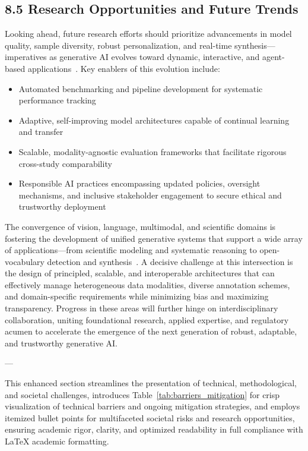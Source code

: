 \documentclass[11pt]{article}
\begin{document}
\subsection{8.5 Research Opportunities and Future Trends}

Looking ahead, future research efforts should prioritize advancements in model quality, sample diversity, robust personalization, and real-time synthesis—imperatives as generative AI evolves toward dynamic, interactive, and agent-based applications~\cite{88,89,90,101,102}. Key enablers of this evolution include:

\begin{itemize}
    \item Automated benchmarking and pipeline development for systematic performance tracking~\cite{88,89}
    \item Adaptive, self-improving model architectures capable of continual learning and transfer
    \item Scalable, modality-agnostic evaluation frameworks that facilitate rigorous cross-study comparability
    \item Responsible AI practices encompassing updated policies, oversight mechanisms, and inclusive stakeholder engagement to secure ethical and trustworthy deployment~\cite{1,8,11,15,16,24,32,54,58,60,63,67,68,69,70,76,77,78,81,82,88,89}
\end{itemize}

The convergence of vision, language, multimodal, and scientific domains is fostering the development of unified generative systems that support a wide array of applications—from scientific modeling and systematic reasoning to open-vocabulary detection and synthesis~\cite{1,2,3,5,6,7,8,9,10,12,13,14,15,16,18,21,22,24,25,26,27,28,29,30,31,32,33,34,35,39,40,42,43,44,45,51,52,53,54,55,56,57,58,59,60,63,67,69,70,76,77,78,79,80,81,82}. A decisive challenge at this intersection is the design of principled, scalable, and interoperable architectures that can effectively manage heterogeneous data modalities, diverse annotation schemes, and domain-specific requirements while minimizing bias and maximizing transparency. Progress in these areas will further hinge on interdisciplinary collaboration, uniting foundational research, applied expertise, and regulatory acumen to accelerate the emergence of the next generation of robust, adaptable, and trustworthy generative AI.

---

This enhanced section streamlines the presentation of technical, methodological, and societal challenges, introduces Table~\ref{tab:barriers_mitigation} for crisp visualization of technical barriers and ongoing mitigation strategies, and employs itemized bullet points for multifaceted societal risks and research opportunities, ensuring academic rigor, clarity, and optimized readability in full compliance with LaTeX academic formatting.
\end{document}
